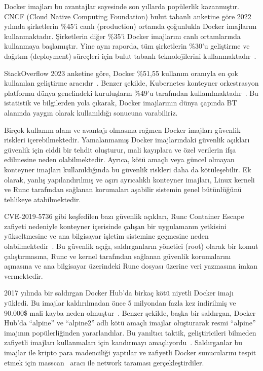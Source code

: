 Docker imajları bu avantajlar sayesinde son yıllarda popülerlik kazanmıştır. CNCF (Cloud Native Computing Foundation) bulut tabanlı anketine göre 2022 yılında şirketlerin \%45'i canlı (production) ortamda çoğunlukla Docker imajlarını kullanmaktadır. Şirketlerin diğer \%35'i Docker imajlarını canlı ortamlarında kullanmaya başlamıştır. Yine aynı raporda, tüm şirketlerin \%30'u geliştirme ve dağıtım (deployment) süreçleri için bulut tabanlı teknolojilerini kullanmaktadır~\autocite{CNCF2022Report}.

StackOverflow 2023 anketine göre, Docker \%51,55 kullanım oranıyla en çok kullanılan geliştirme aracıdır~\autocite{StackOverflow2023Survey}. Benzer şekilde, Kubernetes konteyner orkestrasyon platformu dünya genelindeki kuruluşların \%49'u tarafından kullanılmaktadır~\autocite{CNCF2022Report}. Bu istatistik ve bilgilerden yola çıkarak, Docker imajlarının dünya çapında BT alanında yaygın olarak kullanıldığı sonucuna varabiliriz.

Birçok kullanım alanı ve avantajı olmasına rağmen Docker imajları güvenlik riskleri içerebilmektedir. Yamalanmamış Docker imajlarındaki güvenlik açıkları güvenlik için ciddi bir tehdit oluşturur, mali kayıplara ve özel verilerin ifşa edilmesine neden olabilmektedir. Ayrıca, kötü amaçlı veya güncel olmayan konteyner imajları kullanıldığında bu güvenlik riskleri daha da kötüleşebilir. Ek olarak, yanlış yapılandırılmış ve aşırı ayrıcalıklı konteyner imajları, Linux kerneli ve Runc tarafından sağlanan korumaları aşabilir sistemin genel bütünlüğünü tehlikeye atabilmektedir.

CVE-2019{-}5736 gibi keşfedilen bazı güvenlik açıkları, Runc Container Escape zafiyeti nedeniyle konteyner içerisinde çalışan bir uygulamanın yetkisini yükseltmesine ve ana bilgisayar işletim sistemine geçmesine neden olabilmektedir~\autocite{CVE-2019-5736}. Bu güvenlik açığı, saldırganların yönetici (root) olarak bir komut çalıştırmasına, Runc ve kernel tarafından sağlanan güvenlik korumalarını aşmasına ve ana bilgisayar üzerindeki Runc dosyası üzerine veri yazmasına imkan vermektedir.

2017 yılında bir saldırgan Docker Hub'da birkaç kötü niyetli Docker imajı yükledi. Bu imajlar kaldırılmadan önce 5 milyondan fazla kez indirilmiş ve 90.000\$ mali kayba neden olmuştur~\autocite{arstechnicaBackdooredImages}. Benzer şekilde, başka bir saldırgan, Docker Hub'da ``alpine'' ve ``alpine2'' adlı kötü amaçlı imajlar oluşturarak resmi ``alpine'' imajının popülerliğinden yararlandılar. Bu yanıltıcı taktik, geliştiricileri bilmeden zafiyetli imajları kullanmaları için kandırmayı amaçlıyordu~\autocite{trendmicroVinfo}. Saldırganlar bu imajlar ile kripto para madenciliği yaptılar ve zafiyetli Docker sunucularını tespit etmek için masscan~\autocite{masscanrepo} aracı ile network taraması gerçekleştirdiler.

